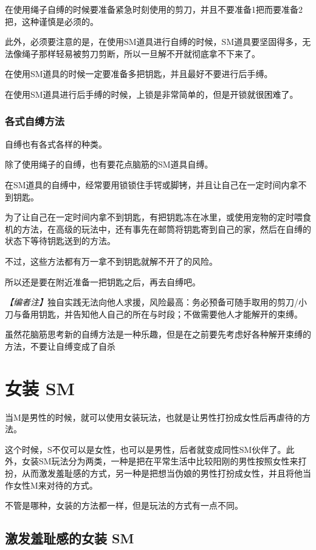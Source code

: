 \documentclass[12pt,UTF8]{ctexbook}
\begin{document}
在使用绳子自缚的时候要准备紧急时刻使用的剪刀，并且不要准备1把而要准备2把，这种谨慎是必须的。

此外，必须要注意的是，在使用SM道具进行自缚的时候，SM道具要坚固得多，无法像绳子那样轻易被剪刀剪断，所以一旦解不开就彻底拿不下来了。

在使用SM道具的时候一定要准备多把钥匙，并且最好不要进行后手缚。

在使用SM道具进行后手缚的时候，上锁是非常简单的，但是开锁就很困难了。

\subsubsection{各式自缚方法}

自缚也有各式各样的种类。

除了使用绳子的自缚，也有要花点脑筋的SM道具自缚。

在SM道具的自缚中，经常要用锁锁住手锷或脚铐，并且让自己在一定时间内拿不到钥匙。

为了让自己在一定时间内拿不到钥匙，有把钥匙冻在冰里，或使用宠物的定时喂食机的方法，在高级的玩法中，还有事先在邮筒将钥匙寄到自己的家，然后在自缚的状态下等待钥匙送到的方法。

不过，这些方法都有万一拿不到钥匙就解不开了的风险。

所以还是要在附近准备一把钥匙之后，再去自缚吧。

\noindent\textit{【编者注】}独自实践无法向他人求援，风险最高：务必预备可随手取用的剪刀/小刀与备用钥匙，并告知他人自己的所在与时段；不做需要他人才能解开的束缚。

虽然花脑筋思考新的自缚方法是一种乐趣，但是在之前要先考虑好各种解开束缚的方法，不要让自缚变成了自杀

\section{女装 SM}

当M是男性的时候，就可以使用女装玩法，也就是让男性打扮成女性后再虐待的方法。

这个时候，S不仅可以是女性，也可以是男性，后者就变成同性SM伙伴了。此外，女装SM玩法分为两类，一种是把在平常生活中比较阳刚的男性按照女性来打扮，从而激发羞耻感的方式，另一种是把想当伪娘的男性打扮成女性，并且将他当作女性M来对待的方式。

不管是哪种，女装的方法都一样，但是玩法的方式有一点不同。 

\subsection{激发羞耻感的女装 SM}
\end{document}
